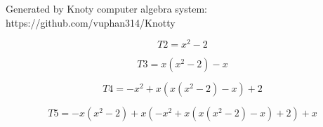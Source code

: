 \documentclass[letterpaper, 10pt]{extarticle}
\begin{document}
Generated by Knoty computer algebra system:
https://github.com/vuphan314/Knotty

\bigskip

\begin{dmath*}
T2 =
    x^{2} - 2
\end{dmath*}


\begin{dmath*}
T3 =
    x \left(x^{2} - 2\right) - x
\end{dmath*}


\begin{dmath*}
T4 =
    - x^{2} + x \left(x \left(x^{2} - 2\right) - x\right) + 2
\end{dmath*}


\begin{dmath*}
T5 =
    - x \left(x^{2} - 2\right) + x \left(- x^{2} + x \left(x \left(x^{2} - 2\right) - x\right) + 2\right) + x
\end{dmath*}
\end{document}
